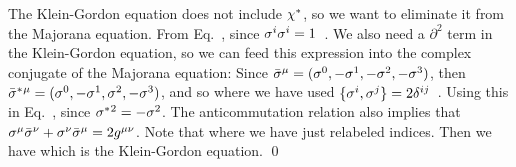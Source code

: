 \documentclass[11pt]{article}
\begin{document}
{	The Klein-Gordon equation does not include $\chi^*$, so we want to eliminate it from the Majorana equation.  From Eq.~,
	since $\sigma^i \sigma^i = 1$~\cite[p.~164]{Sakurai}.  We also need a $\partial^2$ term in the Klein-Gordon equation, so we can feed this expression into the complex conjugate of the Majorana equation:
	Since $\bar{\sigma}^\mu = ( \sigma^0, -\sigma^1, -\sigma^2, -\sigma^3 )$, then $\bar{\sigma}^*{}^\mu = ( \sigma^0, -\sigma^1, \sigma^2, -\sigma^3 )$, and so
	\eq{
		\sigbstm \sigw = (\sigw, -\sigq \sigw, \sigw \sigw, \sige \sigw)
		= (\sigw, \sigw \sigq, \sigw \sigw, -\sigw \sige)
		= \sigw \sigm,
	}
	where we have used $\{ \sigma^i, \sigma^j \} = 2 \delta^{i j}$~\cite[p.~165]{Sakurai}.  Using this in Eq.~,
	since $\sigma^*{}^2 = -\sigma^2$.  The anticommutation relation also implies that $\sigma^\mu \bar{\sigma}^\nu + \sigma^\nu \bar{\sigma}^\mu = 2 g^{\mu \nu}$.  Note that
	where we  have just relabeled indices.  Then we have
	which is the Klein-Gordon equation. \qed
}
\end{document}
